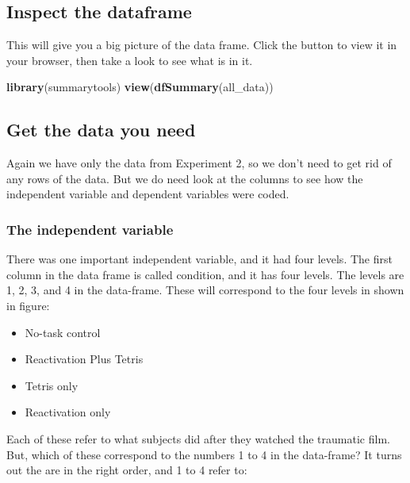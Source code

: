 \documentclass[]{book}
\newenvironment{Shaded}{\begin{snugshade}}{\end{snugshade}}
\newcommand{\KeywordTok}[1]{\textcolor[rgb]{0.13,0.29,0.53}{\textbf{{#1}}}}
\newcommand{\NormalTok}[1]{{#1}}
\providecommand{\tightlist}{%
  \setlength{\itemsep}{0pt}\setlength{\parskip}{0pt}}
\theoremstyle{definition}
\theoremstyle{definition}
\theoremstyle{definition}
\theoremstyle{remark}
\begin{document}
\subsection{Inspect the dataframe}\label{inspect-the-dataframe}

This will give you a big picture of the data frame. Click the button to
view it in your browser, then take a look to see what is in it.

\begin{Shaded}
\begin{Highlighting}[]
\KeywordTok{library}\NormalTok{(summarytools)}
\KeywordTok{view}\NormalTok{(}\KeywordTok{dfSummary}\NormalTok{(all_data))}
\end{Highlighting}
\end{Shaded}

\subsection{Get the data you need}\label{get-the-data-you-need}

Again we have only the data from Experiment 2, so we don't need to get
rid of any rows of the data. But we do need look at the columns to see
how the independent variable and dependent variables were coded.

\subsubsection{The independent variable}\label{the-independent-variable}

There was one important independent variable, and it had four levels.
The first column in the data frame is called condition, and it has four
levels. The levels are 1, 2, 3, and 4 in the data-frame. These will
correspond to the four levels in shown in figure:

\begin{itemize}
\tightlist
\item
  No-task control
\item
  Reactivation Plus Tetris
\item
  Tetris only
\item
  Reactivation only
\end{itemize}

Each of these refer to what subjects did after they watched the
traumatic film. But, which of these correspond to the numbers 1 to 4 in
the data-frame? It turns out the are in the right order, and 1 to 4
refer to:
\end{document}
